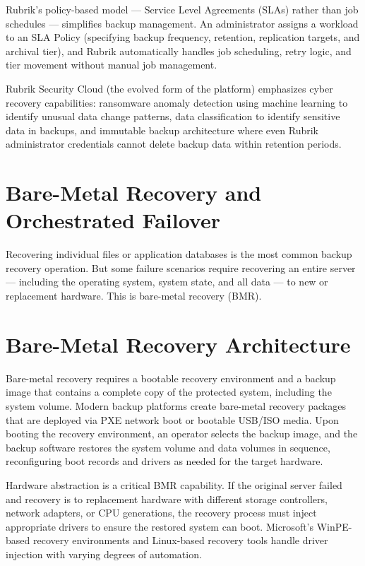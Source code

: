 Rubrik's policy-based model --- Service Level Agreements (SLAs) rather than job schedules --- simplifies backup management. An administrator assigns a workload to an SLA Policy (specifying backup frequency, retention, replication targets, and archival tier), and Rubrik automatically handles job scheduling, retry logic, and tier movement without manual job management.

Rubrik Security Cloud (the evolved form of the platform) emphasizes cyber recovery capabilities: ransomware anomaly detection using machine learning to identify unusual data change patterns, data classification to identify sensitive data in backups, and immutable backup architecture where even Rubrik administrator credentials cannot delete backup data within retention periods.

\section{Bare-Metal Recovery and Orchestrated Failover}
Recovering individual files or application databases is the most common backup recovery operation. But some failure scenarios require recovering an entire server --- including the operating system, system state, and all data --- to new or replacement hardware. This is bare-metal recovery (BMR).

\section{Bare-Metal Recovery Architecture}
Bare-metal recovery requires a bootable recovery environment and a backup image that contains a complete copy of the protected system, including the system volume. Modern backup platforms create bare-metal recovery packages that are deployed via PXE network boot or bootable USB/ISO media. Upon booting the recovery environment, an operator selects the backup image, and the backup software restores the system volume and data volumes in sequence, reconfiguring boot records and drivers as needed for the target hardware.

Hardware abstraction is a critical BMR capability. If the original server failed and recovery is to replacement hardware with different storage controllers, network adapters, or CPU generations, the recovery process must inject appropriate drivers to ensure the restored system can boot. Microsoft's WinPE-based recovery environments and Linux-based recovery tools handle driver injection with varying degrees of automation.


